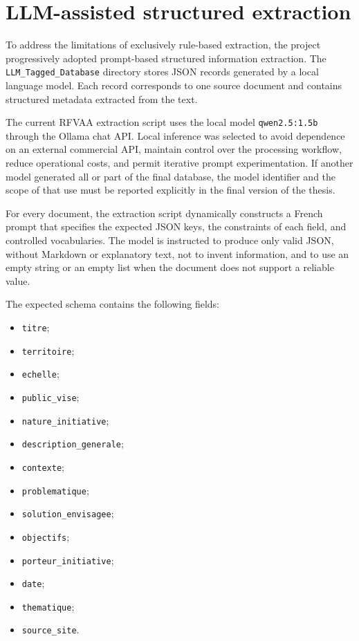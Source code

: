 \documentclass[
11pt,
english,
singlespacing,
headsepline,
]{MastersDoctoralThesis}
\begin{document}
\section{LLM-assisted structured extraction}

To address the limitations of exclusively rule-based extraction, the project
progressively adopted prompt-based structured information extraction. The
\texttt{LLM\_Tagged\_Database} directory stores JSON records generated by a
local language model. Each record corresponds to one source document and
contains structured metadata extracted from the text.

The current RFVAA extraction script uses the local model
\texttt{qwen2.5:1.5b} through the Ollama chat API. Local inference was selected
to avoid dependence on an external commercial API, maintain control over the
processing workflow, reduce operational costs, and permit iterative prompt
experimentation. If another model generated all or part of the final database,
the model identifier and the scope of that use must be reported explicitly in
the final version of the thesis.

For every document, the extraction script dynamically constructs a French prompt
that specifies the expected JSON keys, the constraints of each field, and
controlled vocabularies. The model is instructed to produce only valid JSON,
without Markdown or explanatory text, not to invent information, and to use an
empty string or an empty list when the document does not support a reliable
value.

The expected schema contains the following fields:

\begin{itemize}
    \item \texttt{titre};
    \item \texttt{territoire};
    \item \texttt{echelle};
    \item \texttt{public\_vise};
    \item \texttt{nature\_initiative};
    \item \texttt{description\_generale};
    \item \texttt{contexte};
    \item \texttt{problematique};
    \item \texttt{solution\_envisagee};
    \item \texttt{objectifs};
    \item \texttt{porteur\_initiative};
    \item \texttt{date};
    \item \texttt{thematique};
    \item \texttt{source\_site}.
\end{itemize}
\end{document}
